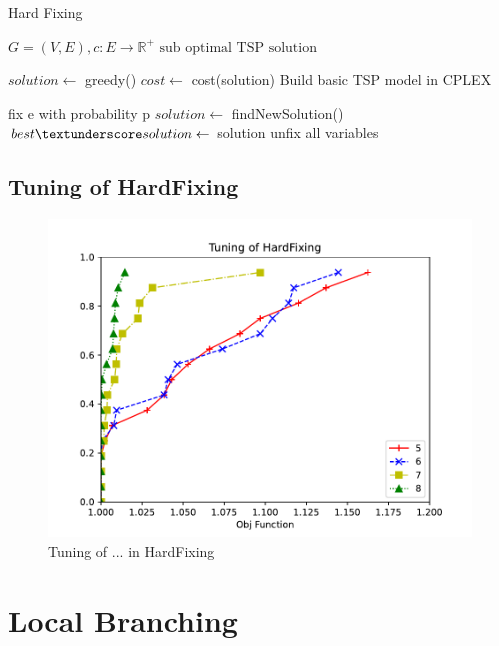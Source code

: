 \begin{algorithm}
    \caption{Hard Fixing}\label{algo:HardFixing}
    \begin{algorithmic}[1]
    \Require $G = (V,E), c:E \to \mathbb{R}^+$
    \Ensure $\text{sub optimal TSP solution}$

    \State $solution \gets$ greedy()
    \State $cost \gets $ cost(solution)
    \State Build basic TSP model in CPLEX



    \State fix e with probability p
    \EndFor
    \State $solution \gets$ findNewSolution()
    \State $ best\textunderscore solution \gets$ solution
    \EndIf
    \State unfix all variables
    \EndWhile

    \end{algorithmic}
\end{algorithm}

\subsection{Tuning of HardFixing}
\begin{figure}[!h]
    \centering
    \includegraphics[width=\textwidth]{images/hard.pdf}
    \caption{Tuning of ...  in HardFixing}
    \label{fig:hard}
\end{figure}

\section{Local Branching}


